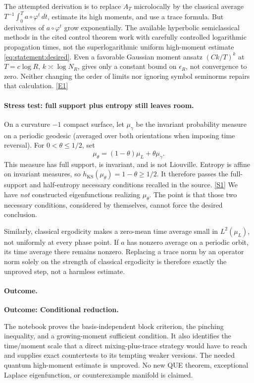 \documentclass[11pt,a4paper]{article}
\newcommand{\sref}[2]{\hyperlink{source:#1:#2}{[S#2]}}
\newcommand{\eref}[2]{\hyperlink{extra:#1:#2}{[E#2]}}
\numberwithin{equation}{section}
\begin{document}
The attempted derivation is to replace $A_T$ microlocally by the classical
average $T^{-1}\int_0^T a\circ\varphi^t\,dt$, estimate its high moments,
and use a trace formula. But derivatives of $a\circ\varphi^t$ grow
exponentially. The available hyperbolic semiclassical methods in the cited
control theorem work with carefully controlled logarithmic propagation
times, not the superlogarithmic uniform high-moment estimate
\eqref{eq:statement:desired}. Even a favorable Gaussian moment ansatz
$(Ck/T)^k$ at $T=c\log R$, $k\asymp\log N_R$, gives only a constant bound
on $\epsilon_R$, not convergence to zero. Neither changing the order of
limits nor ignoring symbol seminorms repairs that calculation.
\eref{statement}{1}

\paragraph{Stress test: full support plus entropy still leaves room.}
On a curvature $-1$ compact surface, let $\mu_\gamma$ be the invariant
probability measure on a periodic geodesic (averaged over both orientations
when imposing time reversal). For $0<\theta\leq1/2$, set
\[
 \mu_\theta=(1-\theta)\mu_L+\theta\mu_\gamma.
\]
This measure has full support, is invariant, and is not Liouville. Entropy
is affine on invariant measures, so
$h_{\mathrm{KS}}(\mu_\theta)=1-\theta\geq1/2$.
It therefore passes the full-support and half-entropy necessary conditions
recalled in the source. \sref{statement}{1}
We have \emph{not} constructed eigenfunctions realizing $\mu_\theta$.
The point is that those two necessary conditions, considered by themselves,
cannot force the desired conclusion.

Similarly, classical ergodicity makes a zero-mean time average small in
$L^2(\mu_L)$, not uniformly at every phase point. If $a$ has nonzero average
on a periodic orbit, its time average there remains nonzero. Replacing a
trace norm by an operator norm solely on the strength of classical
ergodicity is therefore exactly the unproved step, not a harmless estimate.

\paragraph{Outcome.}
\textbf{Outcome: Conditional reduction.}

The notebook proves the basis-independent block criterion, the pinching
inequality, and a growing-moment sufficient condition. It also identifies
the time/moment scale that a direct mixing-plus-trace strategy would have
to reach and supplies exact countertests to its tempting weaker versions.
The needed quantum high-moment estimate is unproved. No new QUE theorem,
exceptional Laplace eigenfunction, or counterexample manifold is claimed.
\end{document}
